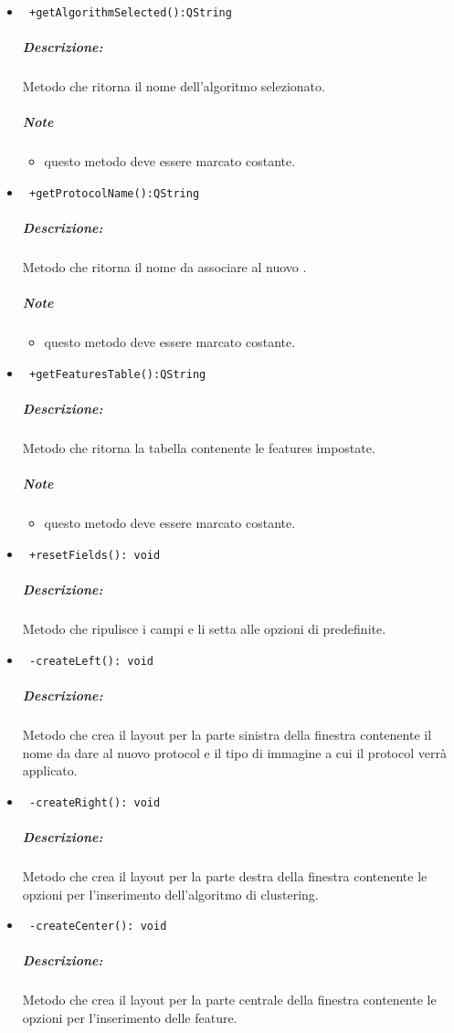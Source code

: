 \begin{itemize}
\item \color{blue}\verb! +getAlgorithmSelected():QString!
\color{black} 
\subparagraph{Descrizione:}Metodo che ritorna il nome dell'algoritmo selezionato.
 \subparagraph{Note}
 \begin{itemize}
 \item questo metodo deve essere marcato costante.
 \end{itemize}

\item \color{blue}\verb! +getProtocolName():QString!
\color{black}
\subparagraph{Descrizione:} Metodo che ritorna il nome da associare al nuovo \protocol{}.
 \subparagraph{Note}
 \begin{itemize}
 \item questo metodo deve essere marcato costante.
 \end{itemize}

\item \color{blue}\verb! +getFeaturesTable():QString!
\color{black} 
\subparagraph{Descrizione:}Metodo che ritorna la tabella contenente le features impostate.
 \subparagraph{Note}
 \begin{itemize}
 \item questo metodo deve essere marcato costante.
 \end{itemize}

\item \color{blue}\verb! +resetFields(): void!
\color{black}
\subparagraph{Descrizione:} Metodo che ripulisce i campi e li setta alle opzioni di predefinite.

\item \color{blue}\verb! -createLeft(): void!
\color{black}
\subparagraph{Descrizione:}Metodo che crea il layout per la parte sinistra della finestra contenente il nome da dare al nuovo protocol\g{} e il tipo di immagine a cui il protocol\g{} verrà applicato.

\item \color{blue}\verb! -createRight(): void!
\color{black} 
\subparagraph{Descrizione:}Metodo che crea il layout per la parte destra della finestra contenente le opzioni per l'inserimento dell'algoritmo di clustering\g{}.

\item \color{blue}\verb! -createCenter(): void!
\color{black} 
\subparagraph{Descrizione:}Metodo che crea il layout per la parte centrale della finestra contenente le opzioni per l'inserimento delle feature\g{}.


\end{itemize}
